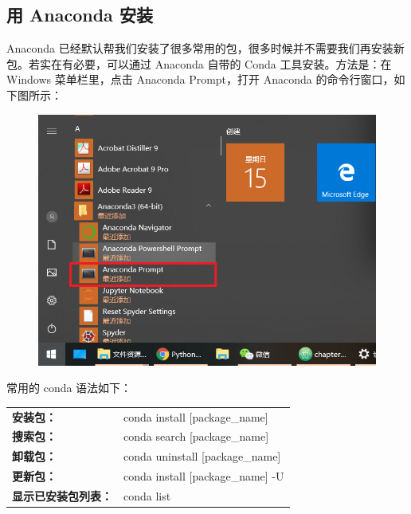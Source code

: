 \subsection{用 Anaconda 安装}

Anaconda 已经默认帮我们安装了很多常用的包，很多时候并不需要我们再安装新包。若实在有必要，可以通过 Anaconda 自带的 Conda 工具安装。方法是：在 Windows 菜单栏里，点击 Anaconda Prompt，打开 Anaconda 的命令行窗口，如下图所示：

\begin{figure}[!ht]
  \centering
  \includegraphics[scale=0.4]{figure/chapter1/anaconda6.png}
\end{figure}

常用的 conda 语法如下：

\begin{center}
\begin{tcolorbox}[title = conda 的常用语法]
  \centering\bf
  \begin{tcboutputlisting}
  \begin{tabular}{>{\bfseries}ll}
    安装包：&conda install [package\_name]\\
    搜索包：&conda search [package\_name]\\
    卸载包：&conda uninstall [package\_name]\\
    更新包： & conda install [package\_name] -U\\
  显示已安装包列表： &conda list
  \end{tabular}
\end{tcboutputlisting}
\end{tcolorbox}
\end{center}

